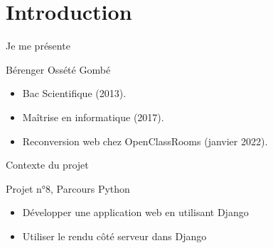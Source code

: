 \section{Introduction}

\begin{frame}{Je me présente}
  \begin{block}{Bérenger Ossété Gombé}
    \begin{itemize}
    \item Bac Scientifique (2013).
    \item Maîtrise en informatique (2017).
    \item Reconversion web chez OpenClassRooms (janvier 2022).
    \end{itemize}
  \end{block}
\end{frame}

\begin{frame}{Contexte du projet}
  \begin{block}{Projet n°8, Parcours Python}
    \begin{itemize}
    \item Développer une application web en utilisant Django
    \item Utiliser le rendu côté serveur dans Django
    \end{itemize}
  \end{block}
\end{frame}

